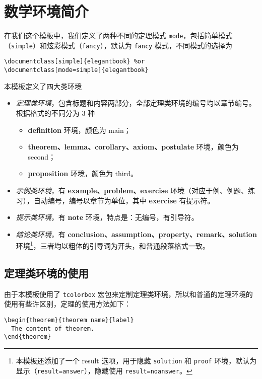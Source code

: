 \documentclass[lang=cn,10pt]{elegantbook}
\begin{document}
\section{数学环境简介}

在我们这个模板中，我们定义了两种不同的定理模式 \lstinline{mode}，包括简单模式（\lstinline{simple}）和炫彩模式（\lstinline{fancy}），默认为 \lstinline{fancy} 模式，不同模式的选择为
\begin{lstlisting}
\documentclass[simple]{elegantbook} %or
\documentclass[mode=simple]{elegantbook}
\end{lstlisting}

本模板定义了四大类环境

\begin{itemize}
  \item \textit{定理类环境}，包含标题和内容两部分，全部定理类环境的编号均以章节编号。根据格式的不同分为 3 种
    \begin{itemize}
      \item \textcolor{main}{\textbf{definition}} 环境，颜色为 \textcolor{main}{main}；
      \item \textcolor{second}{\textbf{theorem、lemma、corollary、axiom、postulate}} 环境，颜色为 \textcolor{second} {second}；
      \item \textcolor{third}{\textbf{proposition}} 环境，颜色为 \textcolor{third}{third}。
    \end{itemize}
  \item \textit{示例类环境}，有 \textbf{example、problem、exercise} 环境（对应于例、例题、练习），自动编号，编号以章节为单位，其中 \textbf{exercise} 有提示符。
  \item \textit{提示类环境}，有 \textbf{note} 环境，特点是：无编号，有引导符。
  \item \textit{结论类环境}，有 \textbf{conclusion、assumption、property、remark、solution} 环境\footnote{本模板还添加了一个 result 选项，用于隐藏 \lstinline{solution} 和 \lstinline{proof} 环境，默认为显示（\lstinline{result=answer}），隐藏使用 \lstinline{result=noanswer}。}，三者均以粗体的引导词为开头，和普通段落格式一致。
\end{itemize}

\subsection{定理类环境的使用}

由于本模板使用了 \lstinline{tcolorbox} 宏包来定制定理类环境，所以和普通的定理环境的使用有些许区别，定理的使用方法如下：
\begin{lstlisting}
\begin{theorem}{theorem name}{label}
  The content of theorem.
\end{theorem}
\end{lstlisting}
\end{document}
